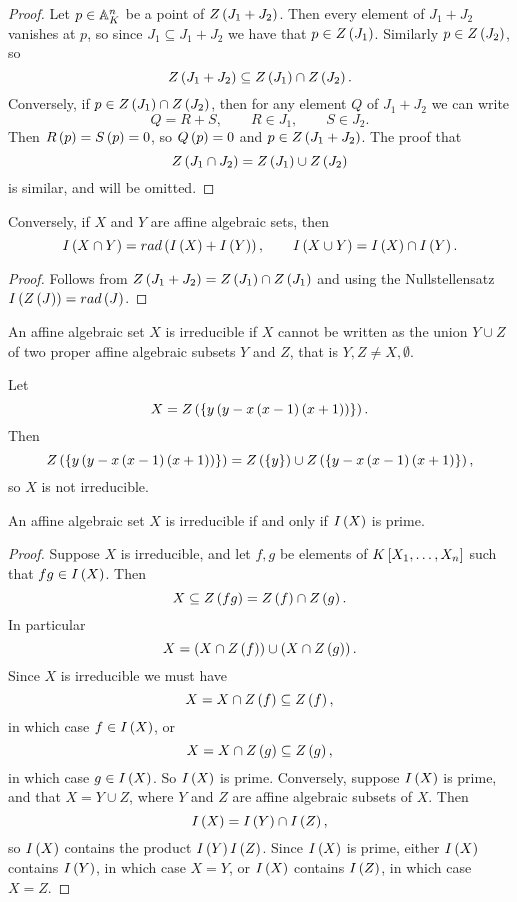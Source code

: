 \begin{proof}
Let $ p \in \A_K^n $ be a point of $ Z\rb{J_1 + J_2} $. Then every element of $ J_1 + J_2 $ vanishes at $ p $, so since $ J_1 \subseteq J_1 + J_2 $ we have that $ p \in Z\rb{J_1} $. Similarly $ p \in Z\rb{J_2} $, so
$$ Z\rb{J_1 + J_2} \subseteq Z\rb{J_1} \cap Z\rb{J_2}. $$
Conversely, if $ p \in Z\rb{J_1} \cap Z\rb{J_2} $, then for any element $ Q $ of $ J_1 + J_2 $ we can write
$$ Q = R + S, \qquad R \in J_1, \qquad S \in J_2. $$
Then $ R\rb{p} = S\rb{p} = 0 $, so $ Q\rb{p} = 0 $ and $ p \in Z\rb{J_1 + J_2} $. The proof that
$$ Z\rb{J_1 \cap J_2} = Z\rb{J_1} \cup Z\rb{J_2} $$
is similar, and will be omitted.
\end{proof}

\begin{corollary}
Conversely, if $ X $ and $ Y $ are affine algebraic sets, then
$$ I\rb{X \cap Y} = rad\rb{I\rb{X} + I\rb{Y}}, \qquad I\rb{X \cup Y} = I\rb{X} \cap I\rb{Y}. $$
\end{corollary}

\begin{proof}
Follows from $ Z\rb{J_1 + J_2} = Z\rb{J_1} \cap Z\rb{J_1} $ and using the Nullstellensatz $ I\rb{Z\rb{J}} = rad\rb{J} $.
\end{proof}

\begin{definition}
An affine algebraic set $ X $ is irreducible if $ X $ cannot be written as the union $ Y \cup Z $ of two proper affine algebraic subsets $ Y $ and $ Z $, that is $ Y, Z \ne X, \emptyset $.
\end{definition}

\begin{example*}
Let
$$ X = Z\rb{\cb{y\rb{y - x\rb{x - 1}\rb{x + 1}}}}. $$
Then
$$ Z\rb{\cb{y\rb{y - x\rb{x - 1}\rb{x + 1}}}} = Z\rb{\cb{y}} \cup Z\rb{\cb{y - x\rb{x - 1}\rb{x + 1}}}, $$
so $ X $ is not irreducible.
\end{example*}

\begin{proposition}
An affine algebraic set $ X $ is irreducible if and only if $ I\rb{X} $ is prime.
\end{proposition}

\begin{proof}
Suppose $ X $ is irreducible, and let $ f, g $ be elements of $ K\sb{X_1, \dots, X_n} $ such that $ fg \in I\rb{X} $. Then
$$ X \subseteq Z\rb{fg} = Z\rb{f} \cap Z\rb{g}. $$
In particular
$$ X = \rb{X \cap Z\rb{f}} \cup \rb{X \cap Z\rb{g}}. $$
Since $ X $ is irreducible we must have
$$ X = X \cap Z\rb{f} \subseteq Z\rb{f}, $$
in which case $ f \in I\rb{X} $, or
$$ X = X \cap Z\rb{g} \subseteq Z\rb{g}, $$
in which case $ g \in I\rb{X} $. So $ I\rb{X} $ is prime. Conversely, suppose $ I\rb{X} $ is prime, and that $ X = Y \cup Z $, where $ Y $ and $ Z $ are affine algebraic subsets of $ X $. Then
$$ I\rb{X} = I\rb{Y} \cap I\rb{Z}, $$
so $ I\rb{X} $ contains the product $ I\rb{Y}I\rb{Z} $. Since $ I\rb{X} $ is prime, either $ I\rb{X} $ contains $ I\rb{Y} $, in which case $ X = Y $, or $ I\rb{X} $ contains $ I\rb{Z} $, in which case $ X = Z $.
\end{proof}

